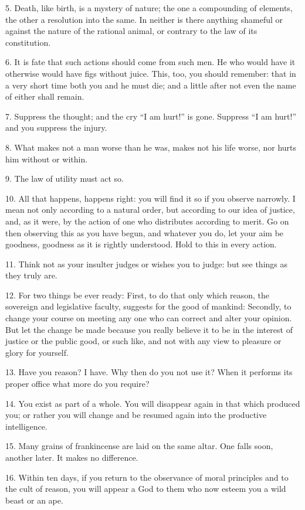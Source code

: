 \documentclass{book}
\begin{document}
5. Death, like birth, is a mystery of nature; the one a compounding of
elements, the other a resolution into the same. In neither is there
anything shameful or against the nature of the rational animal, or
contrary to the law of its constitution.

6. It is fate that such actions should come from such men. He who
would have it otherwise would have figs without juice. This, too, you
should remember: that in a very short time both you and he must die;
and a little after not even the name of either shall remain.

7. Suppress the thought; and the cry ``I am hurt!'' is gone. Suppress ``I
am hurt!'' and you suppress the injury.

8. What makes not a man worse than he was, makes not his life worse,
nor hurts him without or within.

9. The law of utility must act so.

10. All that happens, happens right: you will find it so if you
observe narrowly. I mean not only according to a natural order, but
according to our idea of justice, and, as it were, by the action of
one who distributes according to merit. Go on then observing this as
you have begun, and whatever you do, let your aim be goodness,
goodness as it is rightly understood. Hold to this in every action.

11. Think not as your insulter judges or wishes you to judge: but see
things as they truly are.

12. For two things be ever ready: First, to do that only which reason,
the sovereign and legislative faculty, suggests for the good of
mankind: Secondly, to change your course on meeting any one who can
correct and alter your opinion. But let the change be made because you
really believe it to be in the interest of justice or the public good,
or such like, and not with any view to pleasure or glory for yourself.

13. Have you reason? I have. Why then do you not use it? When it
performs its proper office what more do you require?

14. You exist as part of a whole. You will disappear again in that
which produced you; or rather you will change and be resumed again
into the productive intelligence.

15. Many grains of frankincense are laid on the same altar. One falls
soon, another later. It makes no difference.

16. Within ten days, if you return to the observance of moral
principles and to the cult of reason, you will appear a God to them
who now esteem you a wild beast or an ape.
\end{document}

